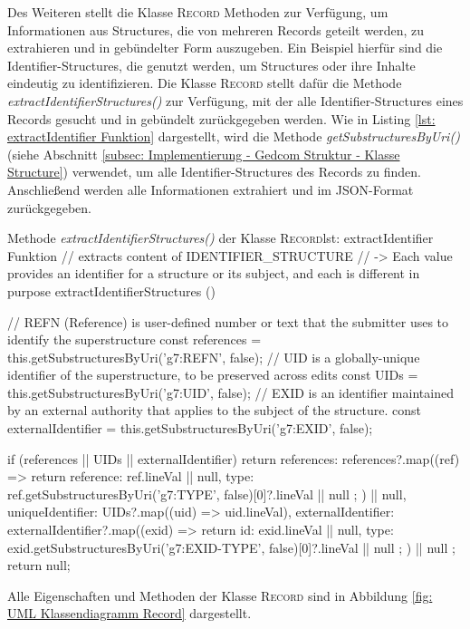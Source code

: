 Des Weiteren stellt die Klasse \textsc{Record} Methoden zur Verfügung, um Informationen aus Structures, die von mehreren Records geteilt werden, zu extrahieren und in gebündelter Form auszugeben. Ein Beispiel hierfür sind die Identifier-Structures, die genutzt werden, um Structures oder ihre Inhalte eindeutig zu identifizieren. Die Klasse \textsc{Record} stellt dafür die Methode \textit{extractIdentifierStructures()} zur Verfügung, mit der alle Identifier-Structures eines Records gesucht und in gebündelt zurückgegeben werden. Wie in Listing \ref{lst: extractIdentifier Funktion} dargestellt, wird die Methode \textit{getSubstructuresByUri()} (siehe Abschnitt \ref{subsec: Implementierung - Gedcom Struktur - Klasse Structure}) verwendet, um alle Identifier-Structures des Records zu finden. Anschließend werden alle Informationen extrahiert und im JSON-Format zurückgegeben. 
\vspace{1em}
\begin{javascript}{Methode \textit{extractIdentifierStructures()} der Klasse \textsc{Record}}{lst: extractIdentifier Funktion}
	// extracts content of IDENTIFIER_STRUCTURE
	//  -> Each value provides an identifier for a structure or its subject, and each is different in purpose
	extractIdentifierStructures () {
		// REFN (Reference) is user-defined number or text that the submitter uses to identify the superstructure
		const references = this.getSubstructuresByUri('g7:REFN', false);
		// UID is a globally-unique identifier of the superstructure, to be preserved across edits
		const UIDs = this.getSubstructuresByUri('g7:UID', false);
		// EXID is an identifier maintained by an external authority that applies to the subject of the structure.
		const externalIdentifier = this.getSubstructuresByUri('g7:EXID', false);
		
		if (references || UIDs || externalIdentifier) {
			return {
				references: references?.map((ref) => {
					return {
						reference: ref.lineVal || null,
						type: ref.getSubstructuresByUri('g7:TYPE', false)[0]?.lineVal || null
					};
				}) || null,
				uniqueIdentifier: UIDs?.map((uid) => uid.lineVal),
				externalIdentifier: externalIdentifier?.map((exid) => {
					return {
						id: exid.lineVal || null,
						type: exid.getSubstructuresByUri('g7:EXID-TYPE', false)[0]?.lineVal || null
					};
				}) || null
			};
		}
		return null;
	}	
\end{javascript}
\vspace{1em}
Alle Eigenschaften und Methoden der Klasse \textsc{Record} sind in Abbildung \ref{fig: UML Klassendiagramm Record} dargestellt.
